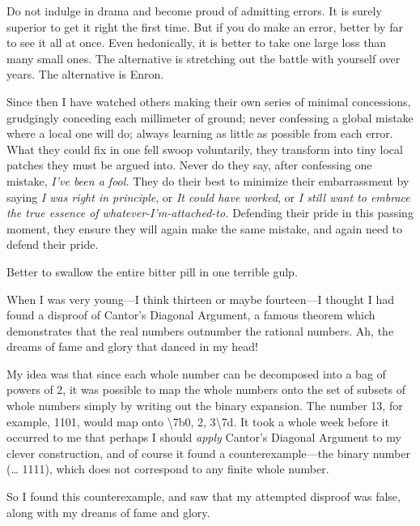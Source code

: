 {
 Do not indulge in drama and become proud of admitting errors. It
is surely superior to get it right the first time. But if you do make
an error, better by far to see it all at once. Even hedonically, it is
better to take one large loss than many small ones. The alternative is
stretching out the battle with yourself over years. The alternative is
Enron.}

{
 Since then I have watched others making their own series of
minimal concessions, grudgingly conceding each millimeter of ground;
never confessing a global mistake where a local one will do; always
learning as little as possible from each error. What they could fix in
one fell swoop voluntarily, they transform into tiny local patches they
must be argued into. Never do they say, after confessing one mistake,
\textit{I've been a fool.} They do their best to
minimize their embarrassment by saying \textit{I was right in
principle}, or \textit{It could have worked}, or \textit{I still want
to embrace the true essence of
whatever-I'm-attached-to.} Defending their pride in
this passing moment, they ensure they will again make the same mistake,
and again need to defend their pride.}

{
 Better to swallow the entire bitter pill in one terrible gulp.}

\myendsectiontext


{
 When I was very young---I think thirteen or maybe fourteen---I
thought I had found a disproof of Cantor's Diagonal
Argument, a famous theorem which demonstrates that the real numbers
outnumber the rational numbers. Ah, the dreams of fame and glory that
danced in my head! }

{
 My idea was that since each whole number can be decomposed into a
bag of powers of 2, it was possible to map the whole numbers onto the
set of subsets of whole numbers simply by writing out the binary
expansion. The number 13, for example, 1101, would map onto
{\textbackslash}{\textquotesingle}7b0, 2,
3{\textbackslash}{\textquotesingle}7d. It took a whole week before it
occurred to me that perhaps I should \textit{apply}
Cantor's Diagonal Argument to my clever construction,
and of course it found a counterexample---the binary number (\ldots
1111), which does not correspond to any finite whole number.}

{
 So I found this counterexample, and saw that my attempted disproof
was false, along with my dreams of fame and glory.}

